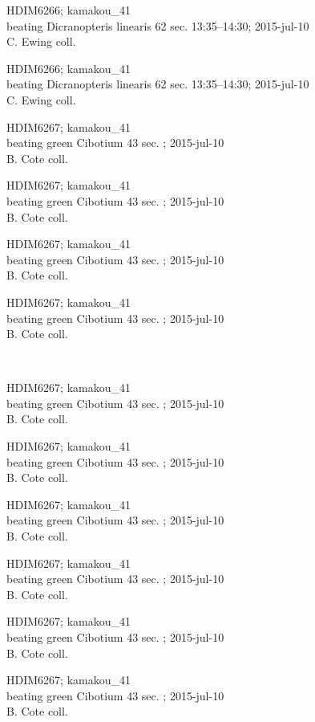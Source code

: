 \documentclass[2pt]{extarticle}
\begin{document}
\noindent
\parbox{0.16\textwidth}{\tiny \raggedright \rule[-0.3\baselineskip]{0pt}{10pt}HDIM6266; kamakou\_41\\ beating Dicranopteris linearis 62 sec. 13:35--14:30; 2015-jul-10\\ C. Ewing coll.}
\parbox{0.16\textwidth}{\tiny \raggedright \rule[-0.3\baselineskip]{0pt}{10pt}HDIM6266; kamakou\_41\\ beating Dicranopteris linearis 62 sec. 13:35--14:30; 2015-jul-10\\ C. Ewing coll.}
\parbox{0.16\textwidth}{\tiny \raggedright \rule[-0.3\baselineskip]{0pt}{10pt}HDIM6267; kamakou\_41\\ beating green Cibotium 43 sec. ; 2015-jul-10\\ B. Cote coll.}
\parbox{0.16\textwidth}{\tiny \raggedright \rule[-0.3\baselineskip]{0pt}{10pt}HDIM6267; kamakou\_41\\ beating green Cibotium 43 sec. ; 2015-jul-10\\ B. Cote coll.}
\parbox{0.16\textwidth}{\tiny \raggedright \rule[-0.3\baselineskip]{0pt}{10pt}HDIM6267; kamakou\_41\\ beating green Cibotium 43 sec. ; 2015-jul-10\\ B. Cote coll.}
\parbox{0.16\textwidth}{\tiny \raggedright \rule[-0.3\baselineskip]{0pt}{10pt}HDIM6267; kamakou\_41\\ beating green Cibotium 43 sec. ; 2015-jul-10\\ B. Cote coll.} \\ 
\vspace{0.001in} 

\noindent
\parbox{0.16\textwidth}{\tiny \raggedright \rule[-0.3\baselineskip]{0pt}{10pt}HDIM6267; kamakou\_41\\ beating green Cibotium 43 sec. ; 2015-jul-10\\ B. Cote coll.}
\parbox{0.16\textwidth}{\tiny \raggedright \rule[-0.3\baselineskip]{0pt}{10pt}HDIM6267; kamakou\_41\\ beating green Cibotium 43 sec. ; 2015-jul-10\\ B. Cote coll.}
\parbox{0.16\textwidth}{\tiny \raggedright \rule[-0.3\baselineskip]{0pt}{10pt}HDIM6267; kamakou\_41\\ beating green Cibotium 43 sec. ; 2015-jul-10\\ B. Cote coll.}
\parbox{0.16\textwidth}{\tiny \raggedright \rule[-0.3\baselineskip]{0pt}{10pt}HDIM6267; kamakou\_41\\ beating green Cibotium 43 sec. ; 2015-jul-10\\ B. Cote coll.}
\parbox{0.16\textwidth}{\tiny \raggedright \rule[-0.3\baselineskip]{0pt}{10pt}HDIM6267; kamakou\_41\\ beating green Cibotium 43 sec. ; 2015-jul-10\\ B. Cote coll.}
\parbox{0.16\textwidth}{\tiny \raggedright \rule[-0.3\baselineskip]{0pt}{10pt}HDIM6267; kamakou\_41\\ beating green Cibotium 43 sec. ; 2015-jul-10\\ B. Cote coll.} \\ 
\vspace{0.001in} 
\end{document}
